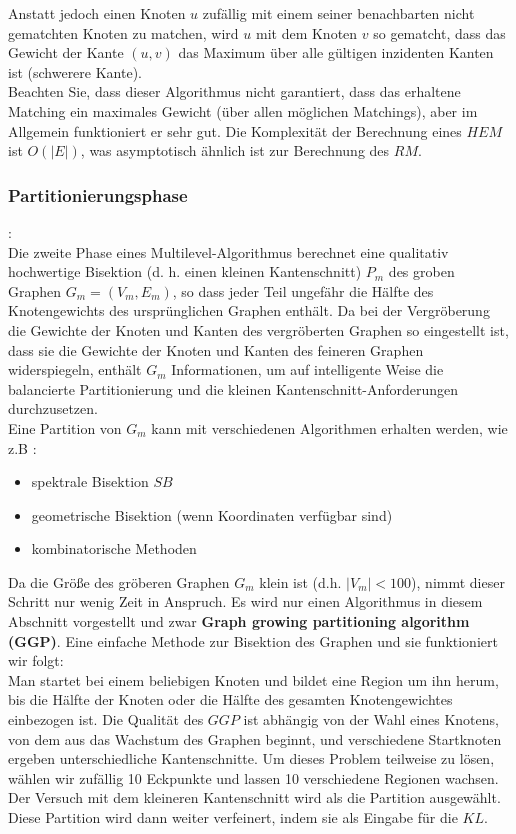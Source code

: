 \documentclass[runningheads]{llncs}
\begin{document}
\begin{itemize}
	 Anstatt jedoch einen Knoten $u$ zufällig mit einem seiner benachbarten nicht gematchten Knoten zu matchen, wird $u$ mit dem Knoten $v$ so gematcht, dass das Gewicht der Kante $(u, v)$ das Maximum über alle gültigen inzidenten Kanten ist (schwerere Kante). \\
	 Beachten Sie, dass dieser Algorithmus nicht garantiert, dass das erhaltene Matching ein maximales Gewicht (über
	 allen möglichen Matchings), aber im Allgemein funktioniert er sehr gut. Die Komplexität der Berechnung eines $HEM$ ist $O(\lvert E \lvert)$, was asymptotisch ähnlich ist zur Berechnung des $RM$.
\end{itemize}


\subsubsection{Partitionierungsphase}:\\[8pt]
Die zweite Phase eines Multilevel-Algorithmus berechnet
eine qualitativ hochwertige Bisektion (d. h. einen kleinen Kantenschnitt) $P_m$ des groben Graphen $G_m = (V_m, E_m)$,
so dass jeder Teil ungefähr die Hälfte des Knotengewichts des ursprünglichen Graphen enthält. Da bei der Vergröberung die Gewichte der Knoten und Kanten des vergröberten Graphen so eingestellt ist, dass sie die Gewichte der Knoten und Kanten des feineren Graphen widerspiegeln, enthält $G_m$ Informationen, um auf intelligente Weise die balancierte Partitionierung und die kleinen Kantenschnitt-Anforderungen durchzusetzen.\\
Eine Partition von $G_m$ kann mit verschiedenen Algorithmen erhalten werden, wie z.B \cite{karypis1998fast}:
\begin{itemize}
	\item spektrale Bisektion $SB$
	\item geometrische Bisektion (wenn Koordinaten verfügbar sind)
	\item kombinatorische Methoden
\end{itemize}
Da die Größe des
gröberen Graphen $G_m$ klein ist (d.h. $\lvert V_m \lvert < 100$), nimmt dieser Schritt nur wenig Zeit in Anspruch.
Es wird nur einen Algorithmus in diesem Abschnitt vorgestellt und zwar \textbf{Graph growing partitioning algorithm (GGP)}. Eine einfache Methode zur Bisektion des Graphen und sie funktioniert wir folgt:\\
Man startet bei einem beliebigen Knoten und bildet eine Region um ihn herum, bis die Hälfte der Knoten oder die Hälfte des gesamten Knotengewichtes einbezogen ist. Die Qualität des $GGP$ ist abhängig von der Wahl eines Knotens, von dem aus das Wachstum des Graphen beginnt, und verschiedene Startknoten ergeben unterschiedliche Kantenschnitte.  
 Um dieses Problem teilweise zu lösen, wählen wir zufällig 10 Eckpunkte
und lassen 10 verschiedene Regionen wachsen. Der Versuch mit dem kleineren Kantenschnitt wird als
die Partition ausgewählt. Diese Partition wird dann weiter verfeinert, indem sie als Eingabe für die $KL$.
\end{document}
